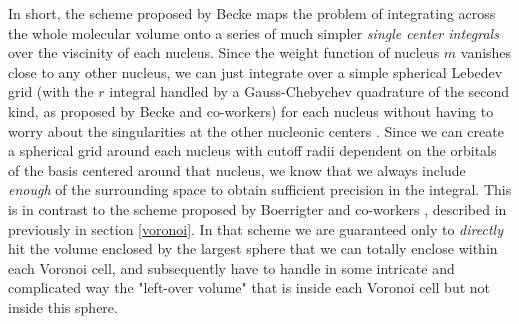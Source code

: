 \documentclass[../../master.tex]{subfiles}
\begin{document}
In short, the scheme proposed by Becke maps the problem of integrating across the whole molecular volume onto a series of much simpler \emph{single center integrals} over the viscinity of each nucleus. Since the weight function of nucleus $m$ vanishes close to any other nucleus, we can just integrate over a simple spherical Lebedev grid (with the $r$ integral handled by a Gauss-Chebychev quadrature of the second kind, as proposed by Becke and co-workers) for each nucleus without having to worry about the singularities at the other nucleonic centers \cite{becke2}. Since we can create a spherical grid around each nucleus with cutoff radii dependent on the orbitals of the basis centered around that nucleus, we know that we always include \emph{enough} of the surrounding space to obtain sufficient precision in the integral. This is in contrast to the scheme proposed by Boerrigter and co-workers \cite{voronoi1}, described in previously in section \ref{voronoi}. In that scheme we are guaranteed only to \emph{directly} hit the volume enclosed by the largest sphere that we can totally enclose within each Voronoi cell, and subsequently have to handle in some intricate and complicated way the "left-over volume" that is inside each Voronoi cell but not inside this sphere. 









\end{document}
